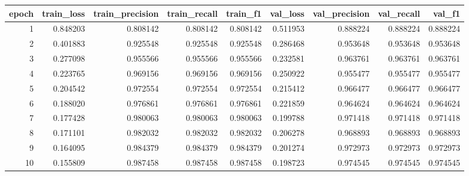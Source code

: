 \begin{tabular}{rrrrrrrrr}
\toprule
epoch & train_loss & train_precision & train_recall & train_f1 & val_loss & val_precision & val_recall & val_f1 \\
\midrule
1 & 0.848203 & 0.808142 & 0.808142 & 0.808142 & 0.511953 & 0.888224 & 0.888224 & 0.888224 \\
2 & 0.401883 & 0.925548 & 0.925548 & 0.925548 & 0.286468 & 0.953648 & 0.953648 & 0.953648 \\
3 & 0.277098 & 0.955566 & 0.955566 & 0.955566 & 0.232581 & 0.963761 & 0.963761 & 0.963761 \\
4 & 0.223765 & 0.969156 & 0.969156 & 0.969156 & 0.250922 & 0.955477 & 0.955477 & 0.955477 \\
5 & 0.204542 & 0.972554 & 0.972554 & 0.972554 & 0.215412 & 0.966477 & 0.966477 & 0.966477 \\
6 & 0.188020 & 0.976861 & 0.976861 & 0.976861 & 0.221859 & 0.964624 & 0.964624 & 0.964624 \\
7 & 0.177428 & 0.980063 & 0.980063 & 0.980063 & 0.199788 & 0.971418 & 0.971418 & 0.971418 \\
8 & 0.171101 & 0.982032 & 0.982032 & 0.982032 & 0.206278 & 0.968893 & 0.968893 & 0.968893 \\
9 & 0.164095 & 0.984379 & 0.984379 & 0.984379 & 0.201274 & 0.972973 & 0.972973 & 0.972973 \\
10 & 0.155809 & 0.987458 & 0.987458 & 0.987458 & 0.198723 & 0.974545 & 0.974545 & 0.974545 \\
\bottomrule
\end{tabular}
